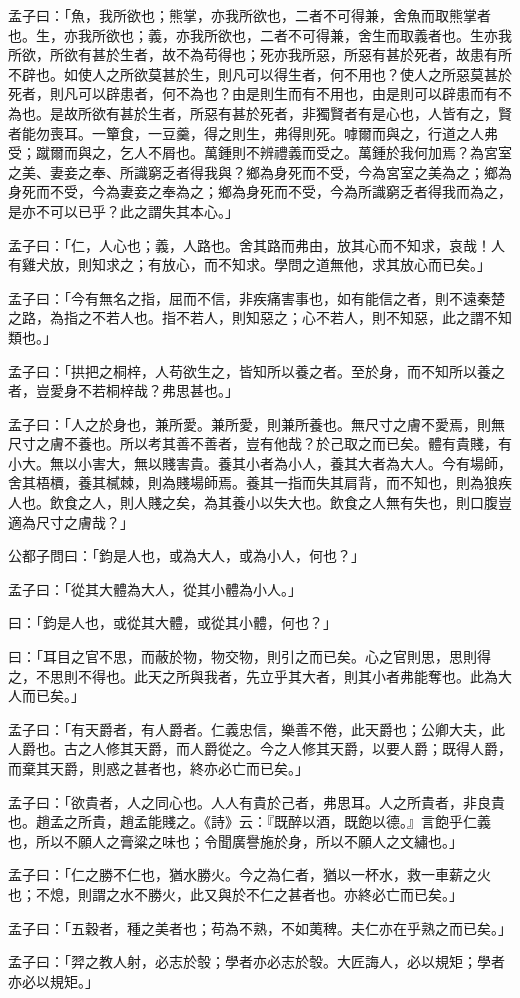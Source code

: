 \documentclass[12pt,a4paper]{ctexbook}
\begin{document}
孟子曰：「魚，我所欲也；熊掌，亦我所欲也，二者不可得兼，舍魚而取熊掌者也。生，亦我所欲也；義，亦我所欲也，二者不可得兼，舍生而取義者也。生亦我所欲，所欲有甚於生者，故不為苟得也；死亦我所惡，所惡有甚於死者，故患有所不辟也。如使人之所欲莫甚於生，則凡可以得生者，何不用也？使人之所惡莫甚於死者，則凡可以辟患者，何不為也？由是則生而有不用也，由是則可以辟患而有不為也。是故所欲有甚於生者，所惡有甚於死者，非獨賢者有是心也，人皆有之，賢者能勿喪耳。一簞食，一豆羹，得之則生，弗得則死。嘑爾而與之，行道之人弗受；蹴爾而與之，乞人不屑也。萬鍾則不辨禮義而受之。萬鍾於我何加焉？為宮室之美、妻妾之奉、所識窮乏者得我與？鄉為身死而不受，今為宮室之美為之；鄉為身死而不受，今為妻妾之奉為之；鄉為身死而不受，今為所識窮乏者得我而為之，是亦不可以已乎？此之謂失其本心。」\par
孟子曰：「仁，人心也；義，人路也。舍其路而弗由，放其心而不知求，哀哉！人有雞犬放，則知求之；有放心，而不知求。學問之道無他，求其放心而已矣。」\par
孟子曰：「今有無名之指，屈而不信，非疾痛害事也，如有能信之者，則不遠秦楚之路，為指之不若人也。指不若人，則知惡之；心不若人，則不知惡，此之謂不知類也。」\par
孟子曰：「拱把之桐梓，人苟欲生之，皆知所以養之者。至於身，而不知所以養之者，豈愛身不若桐梓哉？弗思甚也。」\par
孟子曰：「人之於身也，兼所愛。兼所愛，則兼所養也。無尺寸之膚不愛焉，則無尺寸之膚不養也。所以考其善不善者，豈有他哉？於己取之而已矣。體有貴賤，有小大。無以小害大，無以賤害貴。養其小者為小人，養其大者為大人。今有場師，舍其梧檟，養其樲棘，則為賤場師焉。養其一指而失其肩背，而不知也，則為狼疾人也。飲食之人，則人賤之矣，為其養小以失大也。飲食之人無有失也，則口腹豈適為尺寸之膚哉？」\par
公都子問曰：「鈞是人也，或為大人，或為小人，何也？」\par
孟子曰：「從其大體為大人，從其小體為小人。」\par
曰：「鈞是人也，或從其大體，或從其小體，何也？」\par
曰：「耳目之官不思，而蔽於物，物交物，則引之而已矣。心之官則思，思則得之，不思則不得也。此天之所與我者，先立乎其大者，則其小者弗能奪也。此為大人而已矣。」\par
孟子曰：「有天爵者，有人爵者。仁義忠信，樂善不倦，此天爵也；公卿大夫，此人爵也。古之人修其天爵，而人爵從之。今之人修其天爵，以要人爵；既得人爵，而棄其天爵，則惑之甚者也，終亦必亡而已矣。」\par
孟子曰：「欲貴者，人之同心也。人人有貴於己者，弗思耳。人之所貴者，非良貴也。趙孟之所貴，趙孟能賤之。《詩》云：『既醉以酒，既飽以德。』言飽乎仁義也，所以不願人之膏粱之味也；令聞廣譽施於身，所以不願人之文繡也。」\par
孟子曰：「仁之勝不仁也，猶水勝火。今之為仁者，猶以一杯水，救一車薪之火也；不熄，則謂之水不勝火，此又與於不仁之甚者也。亦終必亡而已矣。」\par
孟子曰：「五穀者，種之美者也；苟為不熟，不如荑稗。夫仁亦在乎熟之而已矣。」\par
孟子曰：「羿之教人射，必志於彀；學者亦必志於彀。大匠誨人，必以規矩；學者亦必以規矩。」\par
\end{document}
